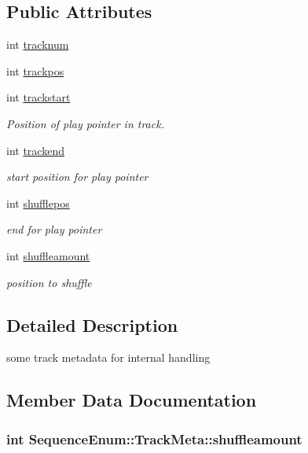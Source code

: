 \subsection*{Public Attributes}
\begin{DoxyCompactItemize}
\item 
int \hyperlink{structSequenceEnum_1_1TrackMeta_a81dd2145cc5abc9e60f5bd6cb695a716}{tracknum}
\item 
int \hyperlink{structSequenceEnum_1_1TrackMeta_a63c0a0b23a0ce779fc9be922e4ad27ad}{trackpos}
\item 
int \hyperlink{structSequenceEnum_1_1TrackMeta_aa28b22719f6f8276364082d9e9479ce5}{trackstart}
\begin{DoxyCompactList}\small\item\em Position of play pointer in track. \end{DoxyCompactList}\item 
int \hyperlink{structSequenceEnum_1_1TrackMeta_a83b4013eff9689ef668b7eeb438b63d6}{trackend}
\begin{DoxyCompactList}\small\item\em start position for play pointer \end{DoxyCompactList}\item 
int \hyperlink{structSequenceEnum_1_1TrackMeta_ac5dddcccca4bf743631453d331fd10ed}{shufflepos}
\begin{DoxyCompactList}\small\item\em end for play pointer \end{DoxyCompactList}\item 
int \hyperlink{structSequenceEnum_1_1TrackMeta_a169e03b3dbff47350963d4d647a09d50}{shuffleamount}
\begin{DoxyCompactList}\small\item\em position to shuffle \end{DoxyCompactList}\end{DoxyCompactItemize}


\subsection{Detailed Description}
some track metadata for internal handling 

\subsection{Member Data Documentation}
\hypertarget{structSequenceEnum_1_1TrackMeta_a169e03b3dbff47350963d4d647a09d50}{
\subsubsection[{shuffleamount}]{\setlength{\rightskip}{0pt plus 5cm}int Sequence\-Enum\-::\-Track\-Meta\-::shuffleamount}}\label{structSequenceEnum_1_1TrackMeta_a169e03b3dbff47350963d4d647a09d50}


